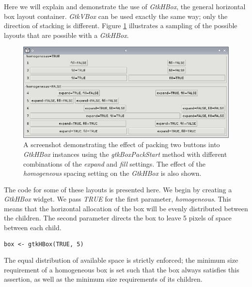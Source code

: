 \documentclass[article]{jss}
\begin{document}
Here we will explain and demonstrate the use of \emph{GtkHBox}, the
general horizontal box layout container. \emph{GtkVBox} can be used exactly the same way; only the direction of stacking is different. Figure \ref{fig:packing} illustrates a sampling of the possible layouts that are possible with a \emph{GtkHBox}.

\begin{figure}
\begin{center}
\includegraphics{packing.png}
\caption{\label{fig:packing}A screenshot demonstrating the effect of
packing two
buttons into \emph{GtkHBox} instances using the \emph{gtkBoxPackStart}
method 
with different combinations of the \emph{expand} and \emph{fill}
settings. 
The effect of the \emph{homogeneous} spacing setting on the
\emph{GtkHBox} is 
also shown.}
\end{center}
\end{figure}

The code for some of these layouts is presented here. We begin by creating a \emph{GtkHBox} widget. We pass \emph{TRUE} for the
first parameter, \emph{homogeneous}. This means that the horizontal allocation of the box will be evenly distributed between the children.  The second parameter directs the box to leave 5 pixels of space between each child. 
\begin{verbatim}
box <- gtkHBox(TRUE, 5)
\end{verbatim}
The equal distribution of available space is strictly enforced; the minimum size requirement of a homogeneous box is set such that the box always satisfies this assertion, as well as the minimum size requirements of its children.
\end{document}
